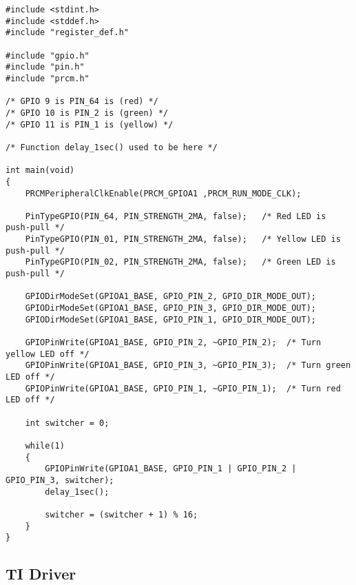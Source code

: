 \begin{lstlisting}[style=CStyle, caption={as}, captionpos=b, label={lst:label}, escapechar=@]
#include <stdint.h>
#include <stddef.h>
#include "register_def.h"
 
#include "gpio.h"
#include "pin.h"
#include "prcm.h"
 
/* GPIO 9 is PIN_64 is (red) */
/* GPIO 10 is PIN_2 is (green) */
/* GPIO 11 is PIN_1 is (yellow) */
 
/* Function delay_1sec() used to be here */
 
int main(void)
{
    PRCMPeripheralClkEnable(PRCM_GPIOA1 ,PRCM_RUN_MODE_CLK);
 
    PinTypeGPIO(PIN_64, PIN_STRENGTH_2MA, false);   /* Red LED is push-pull */
    PinTypeGPIO(PIN_01, PIN_STRENGTH_2MA, false);   /* Yellow LED is push-pull */
    PinTypeGPIO(PIN_02, PIN_STRENGTH_2MA, false);   /* Green LED is push-pull */
 
    GPIODirModeSet(GPIOA1_BASE, GPIO_PIN_2, GPIO_DIR_MODE_OUT);
    GPIODirModeSet(GPIOA1_BASE, GPIO_PIN_3, GPIO_DIR_MODE_OUT);
    GPIODirModeSet(GPIOA1_BASE, GPIO_PIN_1, GPIO_DIR_MODE_OUT);
 
    GPIOPinWrite(GPIOA1_BASE, GPIO_PIN_2, ~GPIO_PIN_2);  /* Turn yellow LED off */
    GPIOPinWrite(GPIOA1_BASE, GPIO_PIN_3, ~GPIO_PIN_3);  /* Turn green LED off */
    GPIOPinWrite(GPIOA1_BASE, GPIO_PIN_1, ~GPIO_PIN_1);  /* Turn red LED off */
 
    int switcher = 0;
 
    while(1)
    {
        GPIOPinWrite(GPIOA1_BASE, GPIO_PIN_1 | GPIO_PIN_2 | GPIO_PIN_3, switcher);
        delay_1sec();
 
        switcher = (switcher + 1) % 16;
    }
}
\end{lstlisting}

\newpage
\subsection{TI Driver}

